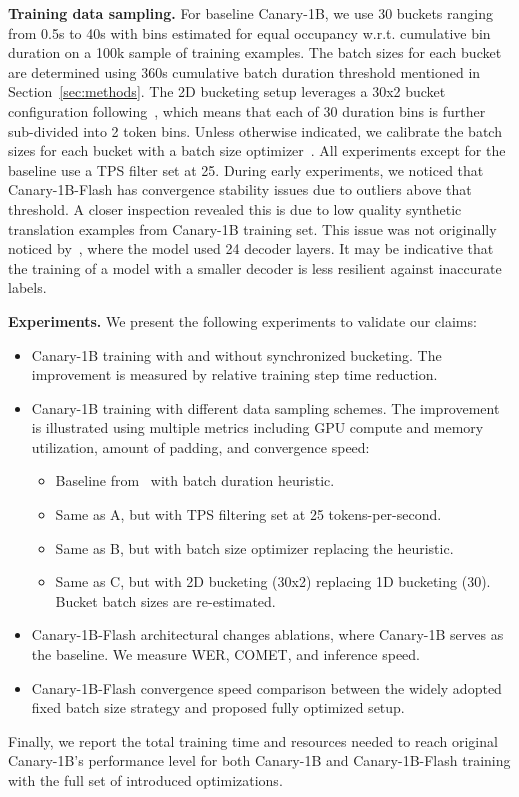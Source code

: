 \documentclass[11pt]{article}
\begin{document}
\textbf{Training data sampling.} 
For baseline Canary-1B, we use 30 buckets ranging from 0.5s to 40s with bins estimated for equal occupancy w.r.t. cumulative bin duration on a 100k sample of training examples. 
The batch sizes for each bucket are determined using 360s cumulative batch duration threshold mentioned in Section~\ref{sec:methods}.
The 2D bucketing setup leverages a 30x2 bucket configuration following~\citet{zelasko2024emmett}, which means that each of 30 duration bins is further sub-divided into 2 token bins. 
Unless otherwise indicated, we calibrate the batch sizes for each bucket with a batch size optimizer~\cite{zelasko2024emmett}. 
All experiments except for the baseline use a TPS filter set at 25. 
During early experiments, we noticed that Canary-1B-Flash has convergence stability issues due to outliers above that threshold. 
A closer inspection revealed this is due to low quality synthetic translation examples from Canary-1B training set. 
This issue was not originally noticed by~\citet{puvvada24_interspeech}, where the model used 24 decoder layers.
It may be indicative that the training of a model with a smaller decoder is less resilient against inaccurate labels.

\textbf{Experiments.} We present the following experiments to validate our claims:
\begin{itemize}
    \item[\textbullet] [E1] Canary-1B training with and without synchronized bucketing. The improvement is measured by relative training step time reduction.
    \item[\textbullet] [E2] Canary-1B training with different data sampling schemes. The improvement is illustrated using multiple metrics including GPU compute and memory utilization, amount of padding, and convergence speed:
    \begin{itemize}
        \item[A.] Baseline from~\citet{puvvada24_interspeech} with batch duration heuristic.
        \item[B.] Same as A, but with TPS filtering set at 25 tokens-per-second.
        \item[C.] Same as B, but with batch size optimizer replacing the heuristic.
        \item[D.] Same as C, but with 2D bucketing (30x2) replacing 1D bucketing (30). Bucket batch sizes are re-estimated.
    \end{itemize}
    \item[\textbullet] [E3] Canary-1B-Flash architectural changes ablations, where Canary-1B serves as the baseline. We measure WER, COMET, and inference speed.
    \item[\textbullet] [E4] Canary-1B-Flash convergence speed comparison between the widely adopted fixed batch size strategy and proposed fully optimized setup.
\end{itemize}
Finally, we report the total training time and resources needed to reach original Canary-1B's performance level for both Canary-1B and Canary-1B-Flash training with the full set of introduced optimizations.
\end{document}
